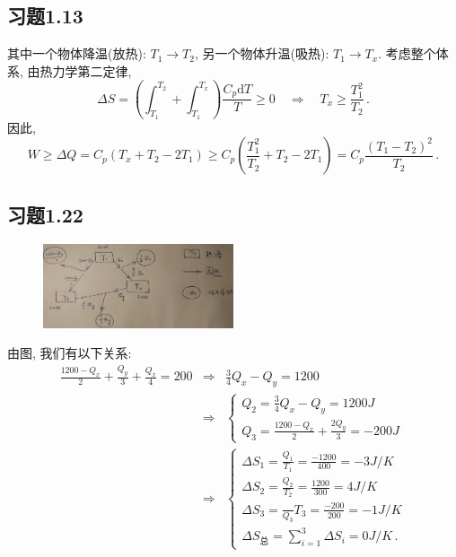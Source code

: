 \documentclass[letterpaper, 10pt]{article}
\newcommand{\dd}{\mathrm{d}}
\begin{document}
\subsection{习题1.13}
其中一个物体降温(放热): $ T_{1} \rightarrow T_{2} $, 另一个物体升温(吸热): $ T_{1} \rightarrow T_x $. 考虑整个体系, 由热力学第二定律, 
\[ \Delta S = \left( \int_{T_{1}}^{T_{2}} + \int_{T_{1}}^{T_x} \right) \frac{C_{p}\dd T}{T} \geq 0 \quad{} \Rightarrow \quad{} T_x \geq \frac{T_{1}^2}{T_{2}} \,. \]
因此, 
\[ W \geq \Delta Q = C_{p} (T_x + T_{2} - 2T_{1}) \geq C_{p} \left( \frac{T_{1}^2}{T_{2}} + T_{2} - 2 T_{1} \right) = C_{p} \frac{(T_{1}-T_{2})^2}{T_{2}} \,. \]

\subsection{习题1.22}
\begin{figure}[htbp]
\centering
\includegraphics[width=0.5\textwidth]{heat-machine}
\end{figure}
由图, 我们有以下关系:
\begin{eqnarray*}
\frac{1200-Q_x}{2} + \frac{Q_y}{3} + \frac{Q_x}{4} = 200 & \Rightarrow & \frac{3}{4}Q_x - Q_y = 1200 \\
& \Rightarrow &
\begin{cases}
Q_2 = \frac{3}{4} Q_x - Q_y = 1200 J \\
Q_3 = \frac{1200-Q_x}{2} + \frac{2Q_y}{3} = -200J
\end{cases} \\
& \Rightarrow & 
\begin{cases}
\Delta S_1 = \frac{Q_1}{T_1} = \frac{-1200}{400} = -3J/K \\
\Delta S_2 = \frac{Q_2}{T_2} = \frac{1200}{300} = 4J/K \\ 
\Delta S_3 = \frac{}{Q_3}{T_3} = \frac{-200}{200} = -1J/K \\
\Delta S_{\text{总}} = \sum_{i = 1}^{3} \Delta S_{i} = 0J/K \,.
\end{cases}
\end{eqnarray*}
\end{document}
